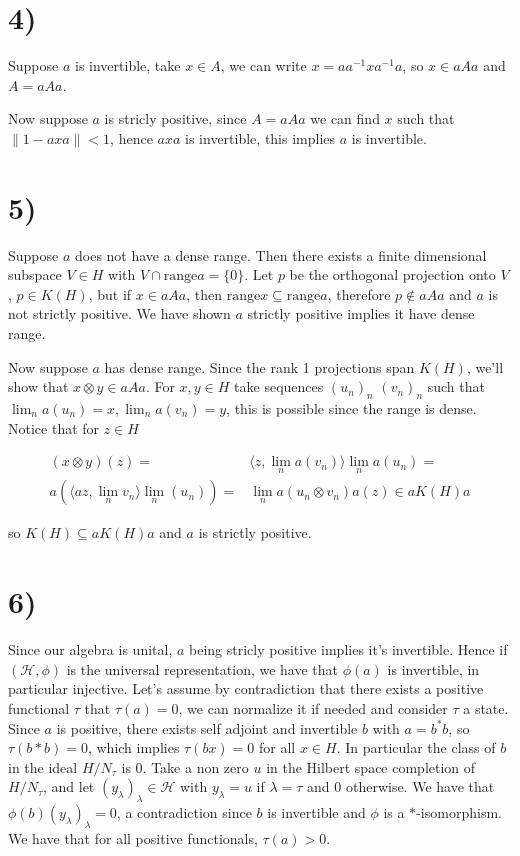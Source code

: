 \documentclass{article}
\begin{document}
\section*{4)}

Suppose $a$ is invertible, take $x\in A$, we can write $x=a a^{-1}x a^{-1}a$,
so $x\in aAa$ and $A=aAa$.

Now suppose $a$ is stricly positive, since $A=aAa$ we can find $x$ such that
$\|1-axa\|<1$, hence $axa$ is invertible, this implies $a$ is invertible. 

\section*{5)}

Suppose $a$ does not have a dense range. Then there exists a finite dimensional
subspace $V\in H$ with $V\cap \text{range} a=\{0\}$. Let $p$ be the orthogonal
projection onto $V$, $p\in K(H)$, but if $x\in aAa$, then $\text{range} x\subseteq 
\text{range} a $, therefore $p\notin aAa$ and $a$ is not strictly positive.
We have shown $a$ strictly positive implies it have dense range.

Now suppose $a$ has dense range. Since the rank 1 projections span $K(H)$, 
we'll show that $x\otimes y \in aAa$. For $x,y\in H$ take sequences $(u_n)_n$
$(v_n)_n$ such that $\lim_n a(u_n)=x, \lim_n a(v_n)=y$, this is possible since
the range is dense.
Notice that  for $z\in H$

\begin{align*}
    (x\otimes y)(z)=& \langle z,\lim_n a(v_n) \rangle \lim_n a(u_n)=\\
    a (\langle az, \lim_n v_n \rangle \lim_n (u_n))=&\lim_n a(u_n\otimes v_n)a(z)\in aK(H)a
\end{align*}

so $K(H)\subseteq aK(H)a$ and $a$ is strictly positive.


\section*{6)}

Since our algebra is unital, $a$ being stricly positive implies it's invertible.
Hence if $(\mathcal{H},\phi)$ is the universal representation, we have that $\phi(a)$ is
invertible, in particular injective. 
Let's assume by contradiction that there exists a positive functional
 $\tau$ that $\tau(a)=0$, we can normalize it if needed and consider $\tau$
 a state. 
 Since $a$ is positive, there exists self adjoint and invertible  $b$ with $a=b^* b$,
 so $\tau(b*b)=0$, which implies $\tau(bx)=0$ for all $x\in H$. In particular
 the class of $b$ in the ideal $H/N_\tau$ is $0$. Take a non zero $u$ in 
 the Hilbert space completion of $H/N_\tau$, and let $(y_\lambda)_\lambda \in 
 \mathcal{H}$ with $y_\lambda=u $ if $\lambda=\tau$ and $0$ otherwise.
 We have that $\phi(b)(y_\lambda)_\lambda=0$, a contradiction since $b$
 is invertible and $\phi$ is a $*$-isomorphism. 
 We have that for all positive functionals, $\tau(a)>0$.  
\end{document}
